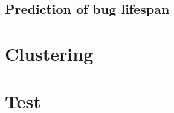 \subsection{Prediction of bug lifespan} %
\label{sub:Prediction of bug lifespan}

\section{Clustering} %
\label{sub:Clustering}

\section{Test} %
\label{sec:Test}

